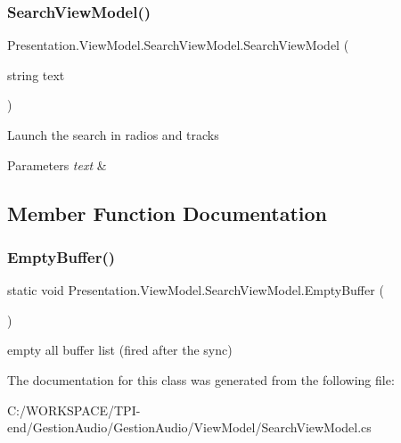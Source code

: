 \subsubsection{\texorpdfstring{Search\+View\+Model()}{SearchViewModel()}}
{\footnotesize\ttfamily Presentation.\+View\+Model.\+Search\+View\+Model.\+Search\+View\+Model (\begin{DoxyParamCaption}\item[{string}]{text }\end{DoxyParamCaption})}



Launch the search in radios and tracks 


\begin{DoxyParams}{Parameters}
{\em text} & \\
\hline
\end{DoxyParams}


\subsection{Member Function Documentation}
\mbox{\label{class_presentation_1_1_view_model_1_1_search_view_model_aca916aa79980de7c81ac70a9f19ed0e3}} 
\subsubsection{\texorpdfstring{Empty\+Buffer()}{EmptyBuffer()}}
{\footnotesize\ttfamily static void Presentation.\+View\+Model.\+Search\+View\+Model.\+Empty\+Buffer (\begin{DoxyParamCaption}{ }\end{DoxyParamCaption})\hspace{0.3cm}{\ttfamily [static]}}



empty all buffer list (fired after the sync) 



The documentation for this class was generated from the following file\+:\begin{DoxyCompactItemize}
\item 
C\+:/\+W\+O\+R\+K\+S\+P\+A\+C\+E/\+T\+P\+I-\/end/\+Gestion\+Audio/\+Gestion\+Audio/\+View\+Model/Search\+View\+Model.\+cs\end{DoxyCompactItemize}
